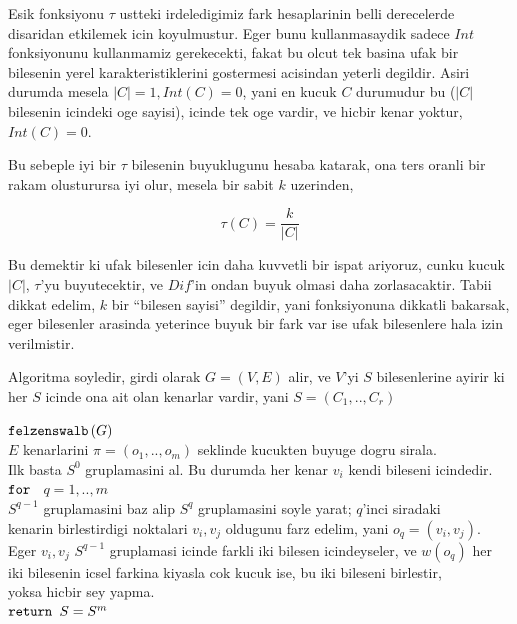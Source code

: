 \documentclass[12pt,fleqn]{article}\usepackage{../common}
\begin{document}
Esik fonksiyonu $\tau$ ustteki irdeledigimiz fark hesaplarinin belli
derecelerde disaridan etkilemek icin koyulmustur. Eger bunu kullanmasaydik
sadece $Int$ fonksiyonunu kullanmamiz gerekecekti, fakat bu olcut tek
basina ufak bir bilesenin yerel karakteristiklerini gostermesi acisindan yeterli
degildir. Asiri durumda mesela $|C| = 1,Int(C)=0$, yani en kucuk $C$
durumudur bu ($|C|$ bilesenin icindeki oge sayisi), icinde tek oge vardir,
ve hicbir kenar yoktur, $Int(C) = 0$.  

Bu sebeple iyi bir $\tau$ bilesenin buyuklugunu hesaba katarak, ona ters
oranli bir rakam olusturursa iyi olur, mesela bir sabit $k$ uzerinden,

$$ \tau(C) = \frac{k}{|C|} $$

Bu demektir ki ufak bilesenler icin daha kuvvetli bir ispat ariyoruz, cunku
kucuk $|C|$, $\tau$'yu buyutecektir, ve $Dif$'in ondan buyuk olmasi daha
zorlasacaktir. Tabii dikkat edelim, $k$ bir ``bilesen sayisi'' degildir,
yani fonksiyonuna dikkatli bakarsak, eger bilesenler arasinda yeterince
buyuk bir fark var ise ufak bilesenlere hala izin verilmistir.

Algoritma soyledir, girdi olarak $G=(V,E)$ alir, ve $V$'yi $S$
bilesenlerine ayirir ki her $S$ icinde ona ait olan kenarlar vardir, yani
$S=(C_1,..,C_r)$ 

\begin{algorithm}[h]
\begin{pseudocode}
\codename $\mbox{\texttt{felzenswalb}}\left(G\right)$\\
\codeline \> $E$ kenarlarini $\pi = (o_1,..,o_m)$ seklinde kucukten buyuge dogru sirala. \\
\codeline \> Ilk basta $S^0$ gruplamasini al. Bu durumda her kenar $v_i$
kendi bileseni icindedir. \\ 
\codeline \> $\mbox{\texttt{for }}$ $q = 1,..,m$ \\
\codeline \> \> $S^{q-1}$ gruplamasini baz alip $S^q$ gruplamasini soyle
yarat; $q$'inci siradaki  \\
\codeline \> \> kenarin birlestirdigi noktalari $v_i,v_j$ oldugunu farz
edelim, yani $o_q = (v_i,v_j)$. \\ 
\codeline \> \> Eger $v_i,v_j$ $S^{q-1}$ gruplamasi icinde farkli iki
bilesen icindeyseler, ve $w(o_q)$ her  \\
\codeline \> \> iki bilesenin icsel farkina kiyasla cok kucuk ise, bu iki
bileseni birlestir, \\ 
\codeline \> \> yoksa hicbir sey yapma. \\
\codeline \> $\mbox{\texttt{return }} S=S^m$ 
\end{pseudocode}
\end{algorithm}
\end{document}
